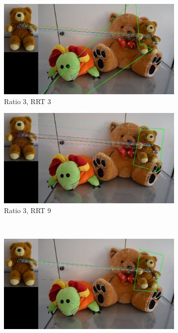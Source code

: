\documentclass[a4paper]{article}
\begin{document}
\begin{figure}[h!]
    \begin{subfigure}[b]{0.45\textwidth}
        \includegraphics[width=\textwidth]{Data4_DetRANMatches_3_0_ratio3_RRT3_NF1000.png}
        \caption{Ratio 3, RRT 3}
        \label{fig:data430331}
    \end{subfigure}
    \quad
    \begin{subfigure}[b]{0.45\textwidth}
        \includegraphics[width=\textwidth]{Data4_DetRANMatches_3_0_ratio3_RRT9_NF1000.png}
        \caption{Ratio 3, RRT 9}
        \label{fig:data430391}
    \end{subfigure}
    \\
    \begin{subfigure}[b]{0.45\textwidth}
        \includegraphics[width=\textwidth]{Data4_DetRANMatches_3_0_ratio9_RRT3_NF1000.png}

\end{subfigure}
\end{figure}
\end{document}
